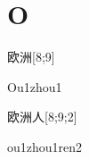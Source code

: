 ﻿%
\section*{O}

\begin{verbete}[Ou1zhou1]{欧洲}[8;9]
\begin{pronuncia}{Ou1zhou1}
\end{pronuncia}
\end{verbete}

\begin{verbete}{欧洲人}[8;9;2]
\begin{pronuncia}{ou1zhou1ren2}
\end{pronuncia}
\end{verbete}

